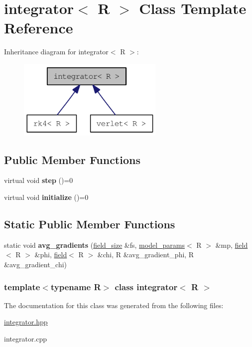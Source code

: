 \hypertarget{classintegrator}{
\section{integrator$<$ R $>$ Class Template Reference}
\label{classintegrator}
}
Inheritance diagram for integrator$<$ R $>$:\nopagebreak
\begin{figure}[H]
\begin{center}
\leavevmode
\includegraphics[width=198pt]{classintegrator__inherit__graph}
\end{center}
\end{figure}
\subsection*{Public Member Functions}
\begin{DoxyCompactItemize}
\item 
\hypertarget{classintegrator_a68b2658800a1cf018d4f6149b7cea680}{
virtual void {\bfseries step} ()=0}
\label{classintegrator_a68b2658800a1cf018d4f6149b7cea680}

\item 
\hypertarget{classintegrator_a7302a82ffd83da07291636ad2b4ed706}{
virtual void {\bfseries initialize} ()=0}
\label{classintegrator_a7302a82ffd83da07291636ad2b4ed706}

\end{DoxyCompactItemize}
\subsection*{Static Public Member Functions}
\begin{DoxyCompactItemize}
\item 
\hypertarget{classintegrator_a4443fc784fb6a07ef2f3d521e53fa53f}{
static void {\bfseries avg\_\-gradients} (\hyperlink{structfield__size}{field\_\-size} \&fs, \hyperlink{structmodel__params}{model\_\-params}$<$ R $>$ \&mp, \hyperlink{classfield}{field}$<$ R $>$ \&phi, \hyperlink{classfield}{field}$<$ R $>$ \&chi, R \&avg\_\-gradient\_\-phi, R \&avg\_\-gradient\_\-chi)}
\label{classintegrator_a4443fc784fb6a07ef2f3d521e53fa53f}

\end{DoxyCompactItemize}
\subsubsection*{template$<$typename R$>$ class integrator$<$ R $>$}



The documentation for this class was generated from the following files:\begin{DoxyCompactItemize}
\item 
\hyperlink{integrator_8hpp}{integrator.hpp}\item 
integrator.cpp\end{DoxyCompactItemize}
